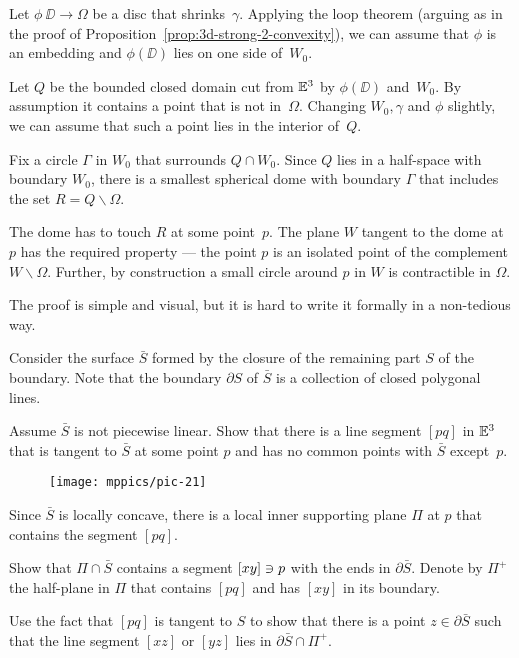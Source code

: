 Let $\phi\:\DD\to \Omega$ be a disc that  shrinks~$\gamma$.
Applying the loop theorem (arguing as in the proof of Proposition~\ref{prop:3d-strong-2-convexity}), we can assume that $\phi$ is an embedding and $\phi(\DD)$ lies on one side of~$W_0$.

Let $Q$ be the bounded closed domain cut from $\mathbb{E}^3$ by $\phi(\DD)$ and~$W_0$. 
By assumption it contains a point that is not in~$\Omega$. 
Changing $W_0,\gamma$ and $\phi$ slightly, we can assume that such a point lies in the interior of~$Q$.

Fix a circle $\Gamma$ in $W_0$ that  surrounds $Q\cap W_0$.
Since $Q$ lies in a half-space with boundary $W_0$, there is a
smallest spherical dome with boundary $\Gamma$ that  includes the set $R=Q\backslash\Omega$.

The dome has to touch $R$ at some point~$p$.
The plane $W$ tangent to the dome at $p$ has the required property --- the point $p$ is an isolated point of the complement $W\backslash \Omega$.
Further, by construction a small circle around $p$ in $W$ is contractible in $\Omega$.

The proof is simple and visual, but it is hard to write it formally in a non-tedious way.

\medskip

Consider the surface $\bar S$ 
formed by the closure of the remaining part $S$ of the boundary.
Note that the boundary $\partial S$ of $\bar S$ is a collection of closed polygonal lines.

Assume $\bar S$ is not piecewise linear.
Show that there is a line segment $[pq]$ in $\mathbb{E}^3$ that is tangent to $\bar S$ at some point $p$ and    has no common points with $\bar S$ except~$p$.


\begin{wrapfigure}{r}{35 mm}
\vskip-4mm
\centering
\texttt{[image: mppics/pic-21]}
\end{wrapfigure}

Since $\bar S$ is locally concave,
there is a local inner supporting plane $\Pi$ at $p$ that contains the segment $[pq]$.

Show that $\Pi\cap \bar S$ contains a segment $[xy]\z\ni p$ with the ends in $\partial \bar S$.
Denote by $\Pi^+$ the half-plane in $\Pi$ that contains $[pq]$ and has $[xy]$ in its boundary.

Use the fact that $[pq]$ is tangent to $S$ to show that there is a point $z\in\partial \bar S$ such that the line segment $[xz]$ or $[yz]$ lies in $\partial \bar S\cap\Pi^+$.
 

